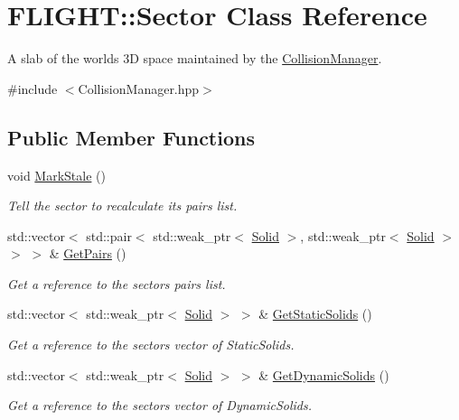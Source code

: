 \hypertarget{class_f_l_i_g_h_t_1_1_sector}{}\section{F\+L\+I\+G\+HT\+:\+:Sector Class Reference}
\label{class_f_l_i_g_h_t_1_1_sector}


A slab of the world\textquotesingle{}s 3D space maintained by the \hyperlink{class_f_l_i_g_h_t_1_1_collision_manager}{Collision\+Manager}.  




{\ttfamily \#include $<$Collision\+Manager.\+hpp$>$}

\subsection*{Public Member Functions}
\begin{DoxyCompactItemize}
\item 
\mbox{\label{class_f_l_i_g_h_t_1_1_sector_ae6c65d9ee3ff8fa1c9a69f18ddefbe0d}} 
void \hyperlink{class_f_l_i_g_h_t_1_1_sector_ae6c65d9ee3ff8fa1c9a69f18ddefbe0d}{Mark\+Stale} ()
\begin{DoxyCompactList}\small\item\em Tell the sector to recalculate its pairs list. \end{DoxyCompactList}\item 
std\+::vector$<$ std\+::pair$<$ std\+::weak\+\_\+ptr$<$ \hyperlink{class_f_l_i_g_h_t_1_1_solid}{Solid} $>$, std\+::weak\+\_\+ptr$<$ \hyperlink{class_f_l_i_g_h_t_1_1_solid}{Solid} $>$ $>$ $>$ \& \hyperlink{class_f_l_i_g_h_t_1_1_sector_a4147f04e14046a915b9f944cc319473c}{Get\+Pairs} ()
\begin{DoxyCompactList}\small\item\em Get a reference to the sector\textquotesingle{}s pairs list. \end{DoxyCompactList}\item 
std\+::vector$<$ std\+::weak\+\_\+ptr$<$ \hyperlink{class_f_l_i_g_h_t_1_1_solid}{Solid} $>$ $>$ \& \hyperlink{class_f_l_i_g_h_t_1_1_sector_a55c801db9199499baa26d65681e23fd3}{Get\+Static\+Solids} ()
\begin{DoxyCompactList}\small\item\em Get a reference to the sector\textquotesingle{}s vector of Static\+Solids. \end{DoxyCompactList}\item 
std\+::vector$<$ std\+::weak\+\_\+ptr$<$ \hyperlink{class_f_l_i_g_h_t_1_1_solid}{Solid} $>$ $>$ \& \hyperlink{class_f_l_i_g_h_t_1_1_sector_a1e1b11bd2a7d0c1bf8014c3df815f6cd}{Get\+Dynamic\+Solids} ()
\begin{DoxyCompactList}\small\item\em Get a reference to the sector\textquotesingle{}s vector of Dynamic\+Solids. \end{DoxyCompactList}\end{DoxyCompactItemize}


